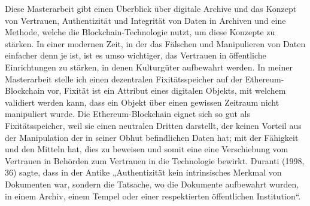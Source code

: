 Diese Masterarbeit gibt einen Überblick über digitale Archive und das Konzept von Vertrauen, Authentizität und Integrität von Daten in Archiven und eine Methode, welche die Blockchain-Technologie nutzt, um diese Konzepte zu stärken. In einer modernen Zeit, in der das Fälschen und Manipulieren von Daten einfacher denn je ist, ist es umso wichtiger, das Vertrauen in öffentliche Einrichtungen zu stärken, in denen Kulturgüter aufbewahrt werden.
In meiner Masterarbeit stelle ich einen dezentralen Fixitätsspeicher auf der Ethereum-Blockchain vor, Fixität ist ein Attribut eines digitalen Objekts, mit welchem validiert werden kann, dass ein Objekt über einen gewissen Zeitraum nicht manipuliert wurde. Die Ethereum-Blockchain eignet sich so gut als Fixitätsspeicher, weil sie einen neutralen Dritten darstellt, der keinen Vorteil aus der Manipulation der in seiner Obhut befindlichen Daten hat; mit der Fähigkeit und den Mitteln hat, dies zu beweisen und somit eine eine Verschiebung vom Vertrauen in Behörden zum Vertrauen in die Technologie bewirkt. Duranti (1998, 36) sagte, dass in der Antike „Authentizität kein intrinsisches Merkmal von Dokumenten war, sondern die Tatsache, wo die Dokumente aufbewahrt wurden, in einem Archiv, einem Tempel oder einer respektierten öffentlichen Institution“.